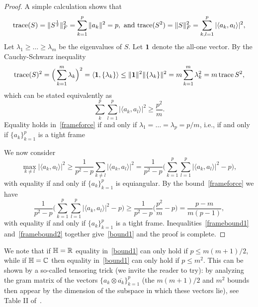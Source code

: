 \begin{proof}
A simple calculation shows that 
\begin{equation*}
\operatorname{trace} (S) = \|S^{\frac{1}{2}}\|_F^2 =\sum_{k=1}^{p} \| a_k\|^2 = p, \,\, \text{and}\,
\operatorname{trace} (S^2) = \|S\|_F^2 =  \sum_{k,l=1}^{p}  |\langle a_k, a_l \rangle|^2,
\label{trace}
\end{equation*}
Let $\lambda_1 \ge   \dots \ge \lambda_m$ be the
eigenvalues of $S$. Let ${\textbf 1}$ denote the all-one vector.
By the Cauchy-Schwarz inequality
\begin{equation*}
\operatorname{trace} (S)^2 = \Big(\sum_{k=1}^{m} \lambda_k \Big)^2 =
\langle {\textbf 1} , \{\lambda_k\} \rangle
\le \| {\textbf 1}\|^2 \| \{\lambda_k\}\|^2 = 
m \sum_{k=1}^{m} \lambda_k^2 = m \operatorname{trace} S^2,
\label{trace1}
\end{equation*}
which can be stated equivalently as
\begin{equation}
  \label{frameforce}  
\sum_{k}^{p} \sum_{l=1}^{p} |\langle a_k, a_l \rangle|^2 \ge \frac{p^2}{m}.
\end{equation}
Equality holds in~\eqref{frameforce} if and only if $\lambda_1 = \dots = \lambda_p = p/m$, i.e., if and only if $\{a_k\}_{k=1}^p$ is a tight frame

We now consider
\begin{equation}
\label{framebound1}
\underset{k\neq l}\max  |\langle a_k, a_l \rangle|^2
\ge \frac{1}{p^2 - p}\sum_{k \neq l} |\langle a_k, a_l \rangle|^2 = 
\frac{1}{p^2 - p} \Big( \sum_{k =1}^p\sum_{l =1}^p |\langle a_k, a_l \rangle|^2 - p \Big),
\end{equation}
with equality if and only if $\{a_k\}_{k=1}^p$ is equiangular. By the bound~\eqref{frameforce} we have
\begin{equation}
\label{framebound2}
\frac{1}{p^2 - p} \Big( \sum_{k =1}^p\sum_{l =1}^p |\langle a_k, a_l \rangle|^2 - p \Big) \ge
\frac{1}{p^2 - p} \Big( \frac{p^2}{m} - p \Big)
= \frac{p-m}{m(p-1)},
\end{equation}
with equality if and only if $\{a_k\}_{k=1}^p$ is a tight frame. Inequalities~\eqref{framebound1} and~\eqref{framebound2} together give~\eqref{bound1} and the proof is complete.

\end{proof}




We note that if $\mathbb{H}=\mathbb{R}$ equality in~\eqref{bound1} can only hold if  $p \le m(m+1)/2$, while if $\mathbb{H}=\mathbb{C}$ then equality in~\eqref{bound1} can only hold if $p \le m^2$. This can be shown by a so-called tensoring trick (we invite the reader to try): by analyzing the gram matrix of the vectors $\{a_k\otimes \overline{a_k}\}_{k=1}^p$ (the $m(m+1)/2$ and $m^2$ bounds then appear by the dimension of the subspace in which these vectors lie), see Table II of~\cite{DGS75}.






